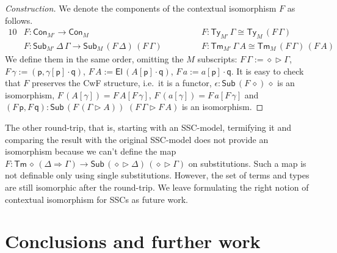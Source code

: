 \documentclass[a4paper,UKenglish]{article}
\newcommand{\ra}{\rightarrow}
\newcommand{\Ra}{\Rightarrow}
\newcommand{\Ty}{\mathsf{Ty}}
\newcommand{\Tm}{\mathsf{Tm}}
\newcommand{\Con}{\mathsf{Con}}
\newcommand{\Sub}{\mathsf{Sub}}
\newcommand{\p}{\mathsf{p}}
\newcommand{\q}{\mathsf{q}}
\newcommand{\ext}{\mathop{\triangleright}}
\newcommand{\U}{\mathsf{U}}
\newcommand{\El}{\mathsf{El}}
\begin{document}
\begin{proof}[Construction]
  We denote the components of the contextual isomorphism $F$ as follows.
  \begin{alignat*}{10}
    & F : \Con_{M'}\ra\Con_M && F : \Ty_{M'}\,\Gamma \cong \Ty_M\,(F\,\Gamma) \\
    & F : \Sub_{M'}\,\Delta\,\Gamma\ra\Sub_M\,(F\,\Delta)\,(F\,\Gamma)\hspace{3em} && F : \Tm_{M'}\,\Gamma\,A \cong \Tm_M\,(F\,\Gamma)\,(F\,A)
  \end{alignat*}
  We define them in the same order, omitting the $M$ subscripts:
  $F\,\Gamma := \diamond\ext\Gamma$, 
  $F\,\gamma := (\p,\gamma[\p]\cdot\q)$, 
  $F\,A := \El\,(A[\p]\cdot\q)$, 
  $F\,a := a[\p]\cdot\q$.
  It is easy to check that $F$ preserves the CwF structure, i.e.\ it
  is a functor, $\epsilon : \Sub\,(F\,\diamond)\,\diamond$ is an
  isomorphism, $F\,(A[\gamma]) = F\,A[F\,\gamma]$, $F\,(a[\gamma]) =
  F\,a[F\,\gamma]$ and $(F\,\p,F\,\q) : \Sub\,(F\,(\Gamma\ext
  A))$ $(F\,\Gamma\ext F\,A)$ is an isomorphism. %
\end{proof}
The other round-trip, that is, starting with an SSC-model, termifying
it and comparing the result with the original SSC-model does not provide an
isomorphism because we can't define the map $F :
\Tm\,\diamond\,(\Delta\Ra\Gamma) \ra
\Sub\,(\diamond\ext\Delta)\,(\diamond\ext\Gamma)$ on
substitutions. Such a map is not definable only using single
substitutions. However, the set of terms and types are still
isomorphic after the round-trip. We leave formulating the right notion
of contextual isomorphism for SSCs as future work.

\section{Conclusions and further work}
\label{sec:conclusion}
\end{document}
